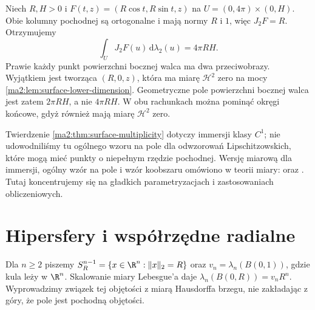 \begin{przyklad}
\label{ma2:ex:surface-double-cylinder}
Niech $R,H>0$ i
$F(t,z)=(R\cos t,R\sin t,z)$ na
$U=(0,4\pi)\times(0,H)$.
Obie kolumny pochodnej są ortogonalne
i mają normy $R$ i $1$, więc $J_2F=R$.
Otrzymujemy
\[
 \int_U J_2F(u)\,\mathrm d\lambda_2(u)=4\pi RH.
\]
Prawie każdy punkt powierzchni bocznej walca
ma dwa przeciwobrazy. Wyjątkiem jest tworząca
$(R,0,z)$, która ma miarę $\mathcal H^2$ zero
na mocy \ref{ma2:lem:surface-lower-dimension}.
Geometryczne pole powierzchni bocznej walca
jest zatem $2\pi RH$,
a nie $4\pi RH$. W obu rachunkach można pominąć
okręgi końcowe, gdyż również mają miarę
$\mathcal H^2$ zero.
\end{przyklad}

\begin{uwaga}
Twierdzenie \ref{ma2:thm:surface-multiplicity}
dotyczy immersji klasy $C^1$; nie udowodniliśmy
tu ogólnego wzoru na pole dla odwzorowań
Lipschitzowskich, które mogą mieć punkty
o niepełnym rzędzie pochodnej. Wersję miarową
dla immersji, ogólny wzór na pole i wzór koobszaru
omówiono w teorii miary:
oraz
.
Tutaj koncentrujemy się na gładkich parametryzacjach
i zastosowaniach obliczeniowych.
\end{uwaga}

\section{Hipersfery i współrzędne radialne}

Dla $n\ge2$ piszemy
$S_R^{n-1}=\{x\in\R^n:\|x\|_2=R\}$ oraz
$v_n=\lambda_n(B(0,1))$, gdzie kula leży w $\R^n$.
Skalowanie miary Lebesgue'a daje
$\lambda_n(B(0,R))=v_nR^n$.
Wyprowadzimy związek tej objętości z miarą
Hausdorffa brzegu, nie zakładając z góry,
że pole jest pochodną objętości.

